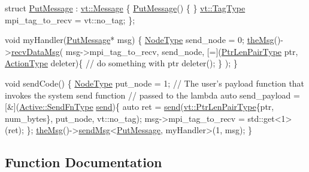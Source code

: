 \begin{DoxyCode}
\textcolor{keyword}{struct }\hyperlink{namespacevt_1_1rdma_ae0a0330c647ec5ac5d508750f4cd4a06}{PutMessage} : \hyperlink{structvt_1_1messaging_1_1_active_msg}{vt::Message} \{
  \hyperlink{namespacevt_1_1rdma_ae0a0330c647ec5ac5d508750f4cd4a06}{PutMessage}() \{ \}
  \hyperlink{namespacevt_a84ab281dae04a52a4b243d6bf62d0e52}{vt::TagType} mpi\_tag\_to\_recv = vt::no\_tag;
\};

\textcolor{keywordtype}{void} myHandler(\hyperlink{namespacevt_1_1rdma_ae0a0330c647ec5ac5d508750f4cd4a06}{PutMessage}* msg) \{
  \hyperlink{namespacevt_a866da9d0efc19c0a1ce79e9e492f47e2}{NodeType} send\_node = 0;
  \hyperlink{namespacevt_aeafd31f866aeb4dc6fc2f6ee97136350}{theMsg}()->\hyperlink{structvt_1_1messaging_1_1_active_messenger_a9dc244ad2e4fbb24a7bb0b0cd2ef0b61}{recvDataMsg}(
    msg->mpi\_tag\_to\_recv, send\_node,
    [=](\hyperlink{namespacevt_a2695972ba7486466c06160df0b12ee2d}{PtrLenPairType} ptr, \hyperlink{namespacevt_ae0a5a7b18cc99d7b732cb4d44f46b0f3}{ActionType} deleter)\{
       \textcolor{comment}{// do something with ptr}
       deleter();
    \}
  );
\}

\textcolor{keywordtype}{void} sendCode() \{
  \hyperlink{namespacevt_a866da9d0efc19c0a1ce79e9e492f47e2}{NodeType} put\_node = 1;
  \textcolor{comment}{// The user's payload function that invokes the system send function}
  \textcolor{comment}{// passed to the lambda}
  \textcolor{keyword}{auto} send\_payload = [&](\hyperlink{structvt_1_1messaging_1_1_active_messenger_a09efd64a8c1bc26a7333c70b76ca01bd}{Active::SendFnType} \hyperlink{group__typesafehan_ga4557b5ce74c8c5df0013cf49738517bf}{send})\{
    \textcolor{keyword}{auto} ret = \hyperlink{group__typesafehan_ga4557b5ce74c8c5df0013cf49738517bf}{send}(\hyperlink{namespacevt_a2695972ba7486466c06160df0b12ee2d}{vt::PtrLenPairType}\{ptr, num\_bytes\}, put\_node, vt::no\_tag);
    msg->mpi\_tag\_to\_recv = std::get<1>(ret);
  \};
  \hyperlink{namespacevt_aeafd31f866aeb4dc6fc2f6ee97136350}{theMsg}()->\hyperlink{group__preregister_ga0162a39473e7f9b490a79a7983d949ac}{sendMsg}<\hyperlink{namespacevt_1_1rdma_ae0a0330c647ec5ac5d508750f4cd4a06}{PutMessage}, myHandler>(1, msg);
\}
\end{DoxyCode}
 

\subsection{Function Documentation}
\mbox{\label{group__sendpayload_ga9417950068f8ceed85f1b5ef53f3ad27}} 

